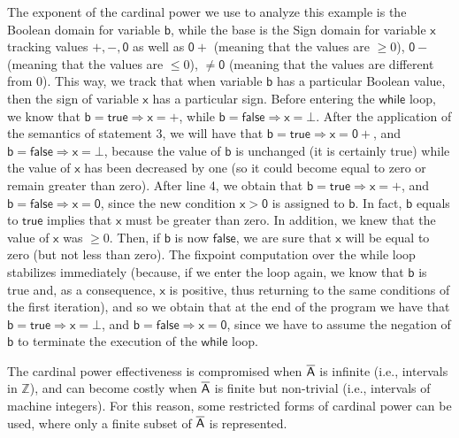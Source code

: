 \documentclass[submission,copyright,creativecommons]{eptcs}
\newcommand{\statement}[1]{\ensuremath{\mathsf{#1}}}
\newcommand{\cel}[1]{\ensuremath{\mathsf{#1}}}
\newcommand{\firstdomain}{\aset{A}}
\begin{document}
The exponent of the cardinal power we use to analyze this example is the Boolean domain for variable $\statement{b}$, while the base is the Sign domain for variable $\statement{x}$ tracking values $\cel{+}, \cel{-}, \cel{0}$ as well as $\cel{0+}$ (meaning that the values are $\geq 0$), $\cel{0-}$ (meaning that the values are $\leq 0$), $\neq\cel{0}$ (meaning that the values are different from 0). This way, we track that when variable \statement{b} has a particular Boolean value, then the sign of variable \statement{x} has a particular sign. Before entering the \statement{while} loop, we know that $\statement{b}=\statement{true} \Rightarrow \statement{x}=\cel{+}$, while $\statement{b}=\statement{false} \Rightarrow \statement{x}=\bot$. After the application of the semantics of statement 3, we will have that $\statement{b}=\statement{true} \Rightarrow \statement{x}=\cel{0+}$, and $\statement{b}=\statement{false} \Rightarrow \statement{x}=\bot$, because the value of \statement{b} is unchanged (it is certainly true) while the value of \statement{x} has been decreased by one (so it could become equal to zero or remain greater than zero). After line 4, we obtain that $\statement{b}=\statement{true} \Rightarrow \statement{x}=\cel{+}$, and $\statement{b}=\statement{false} \Rightarrow \statement{x}=\cel{0}$, since the new condition \statement{x>0} is assigned to \statement{b}. In fact, \statement{b} equals to \statement{true} implies that \statement{x} must be greater than zero. In addition, we knew that the value of \statement{x} was $\geq 0$. Then, if \statement{b} is now \statement{false}, we are sure that \statement{x} will be equal to zero (but not less than zero). The fixpoint computation over the while loop stabilizes immediately (because, if we enter the loop again, we know that \statement{b} is true and, as a consequence, \statement{x} is positive, thus returning to the same conditions of the first iteration), and so we obtain that at the end of the program we have that $\statement{b}=\statement{true} \Rightarrow \statement{x}=\bot$, and $\statement{b}=\statement{false} \Rightarrow \statement{x}=\cel{0}$, since we have to assume the negation of \statement{b} to terminate the execution of the \statement{while} loop. 





The cardinal power effectiveness is compromised when $\firstdomain$ is infinite (i.e., intervals in $\mathbb{Z}$), and can become costly when $\firstdomain$ is finite but non-trivial (i.e., intervals of machine integers). For this reason, some restricted forms of cardinal power can be used, where only a finite subset of $\firstdomain$ is represented.
\end{document}
